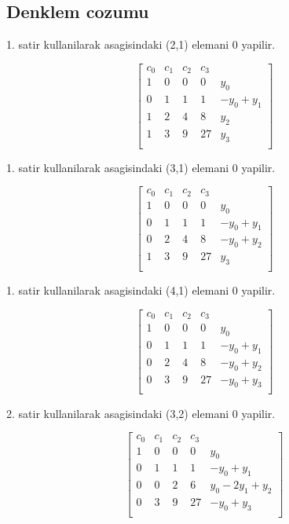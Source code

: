 \documentclass{article}
\begin{document}
\subsection{Denklem cozumu}
1. satir kullanilarak  asagisindaki (2,1) elemani 0 yapilir.\begin{center}
$$ \left[\begin{array}{rrrr|r}
c_{0} & c_{1} & c_{2} & c_{3}\\
1 & 0 & 0 & 0 & y_{0}\\
0 & 1 & 1 & 1 & -y_{0}+y_{1}\\
1 & 2 & 4 & 8 & y_{2}\\
1 & 3 & 9 & 27 & y_{3}\\
\end{array}\right] $$
\end{center}
1. satir kullanilarak  asagisindaki (3,1) elemani 0 yapilir.\begin{center}
$$ \left[\begin{array}{rrrr|r}
c_{0} & c_{1} & c_{2} & c_{3}\\
1 & 0 & 0 & 0 & y_{0}\\
0 & 1 & 1 & 1 & -y_{0}+y_{1}\\
0 & 2 & 4 & 8 & -y_{0}+y_{2}\\
1 & 3 & 9 & 27 & y_{3}\\
\end{array}\right] $$
\end{center}
1. satir kullanilarak  asagisindaki (4,1) elemani 0 yapilir.\begin{center}
$$ \left[\begin{array}{rrrr|r}
c_{0} & c_{1} & c_{2} & c_{3}\\
1 & 0 & 0 & 0 & y_{0}\\
0 & 1 & 1 & 1 & -y_{0}+y_{1}\\
0 & 2 & 4 & 8 & -y_{0}+y_{2}\\
0 & 3 & 9 & 27 & -y_{0}+y_{3}\\
\end{array}\right] $$
\end{center}
2. satir kullanilarak  asagisindaki (3,2) elemani 0 yapilir.\begin{center}
$$ \left[\begin{array}{rrrr|r}
c_{0} & c_{1} & c_{2} & c_{3}\\
1 & 0 & 0 & 0 & y_{0}\\
0 & 1 & 1 & 1 & -y_{0}+y_{1}\\
0 & 0 & 2 & 6 & y_{0}-2y_{1}+y_{2}\\
0 & 3 & 9 & 27 & -y_{0}+y_{3}\\
\end{array}\right] $$
\end{center}
\end{document}
